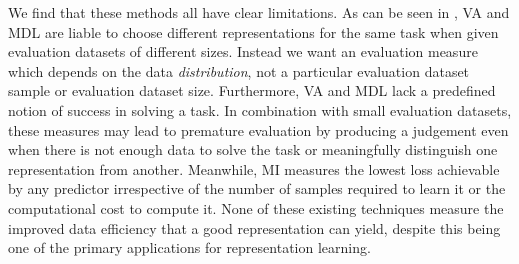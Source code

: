 We find that these methods all have clear limitations.
As can be seen in , VA and MDL are liable to choose different representations for the same task when given evaluation datasets of different sizes.
Instead we want an evaluation measure which depends on the data \emph{distribution}, not a particular evaluation dataset sample or evaluation dataset size.
Furthermore, VA and MDL lack a predefined notion of success in solving a task.
In combination with small evaluation datasets, these measures may lead to premature evaluation by producing a judgement even when there is not enough data to solve the task or meaningfully distinguish one representation from another.
Meanwhile, MI measures the lowest loss achievable by any predictor irrespective of the number of samples required to learn it or the computational cost to compute it.
None of these existing techniques measure the improved data efficiency that a good representation can yield, despite this being one of the primary applications for representation learning.



